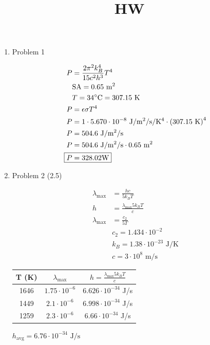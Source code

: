 \documentclass[12pt]{article}
\title{HW}
\date{}
\begin{document}
\begin{enumerate}

    \item Problem 1
    
    \begin{align*}
        P &= \frac{2 \pi^2 k_B^4}{15 c^2 h^3} T^4 \\
        & \text{SA} = 0.65 \text{ m$^2$} \\
        & T = 34 \text{$^\circ$C} = 307.15 \text{ K} \\
        P &= \epsilon \sigma T^4 \\
        P &= 1 \cdot 5.670 \cdot 10^{-8} \text{ J/m$^2$/s/K$^4$} \cdot \left(307.15 \text{ K}\right)^4 \\
        P &= 504.6 \text{ J/m$^2$/s} \\
        P &= 504.6 \text{ J/m$^2$/s} \cdot 0.65 \text{ m$^2$} \\
        \Aboxed{P &= 328.02 \text{W}}
    \end{align*}

    \newpage
    \item Problem 2 (2.5)
    
    \begin{align*}
        \lambda_{\text{max}} &= \frac{hc}{5k_BT} \\
        h &= \frac{\lambda_{\text{max}}5k_BT}{c} \\
        \lambda_{\text{max}} &= \frac{c_2}{5T} \\
        & c_2 = 1.434 \cdot 10^{-2} \\
        & k_B = 1.38 \cdot 10^{-23} \text{ J/K} \\
        & c = 3 \cdot 10^{8} \text{ m/s}
    \end{align*}

    \begin{tabular}{|c|c|c|}
        \hline
        T (K) & $\lambda_{\text{max}}$ & $h = \frac{\lambda_{\text{max}}5k_BT}{c}$ \\
        \hline
        1646 & $1.75 \cdot 10^{-6}$ & $6.626 \cdot 10^{-34}$ J/s \\
        1449 & $2.1 \cdot 10^{-6}$ & $6.998 \cdot 10^{-34}$ J/s \\
        1259 & $2.3 \cdot 10^{-6}$ & $6.66 \cdot 10^{-34}$ J/s \\
        \hline
    \end{tabular}

    $\boxed{h_{\text{avg}} = 6.76 \cdot 10^{-34} \text{ J/s}}$


\end{enumerate}
\end{document}
